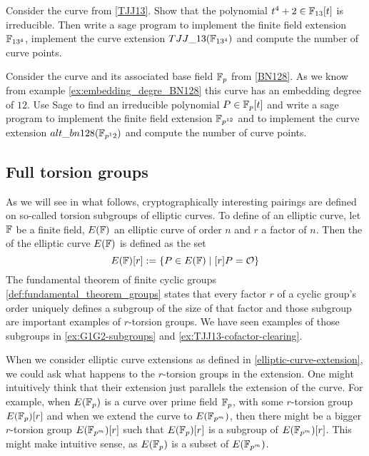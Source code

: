 \begin{exercise}
\label{exercise:TJJ134}
 Consider the  curve from \examplename{} \ref{TJJ13}. Show that the polynomial $t^4+2\in \mathbb{F}_{13}[t]$ is irreducible. Then write a sage program to implement the finite field extension $\mathbb{F}_{13^4}$, implement the curve extension $TJJ\_13(\mathbb{F}_{13^4})$ and compute the number of curve points.
\end{exercise}
\begin{exercise}
\label{exercise:BN128-extension}
Consider the  curve and its associated base field $\mathbb{F}_p$ from \examplename{} \ref{BN128}. As we know from example \ref{ex:embedding_degre_BN128} this curve has an embedding degree of $12$. Use Sage to find an irreducible polynomial $P\in \mathbb{F}_p[t]$ and write a sage program to implement the finite field extension $\mathbb{F}_{p^{12}}$ and to implement the curve extension $alt\_bn128(\mathbb{F}_{p^12})$ and compute the number of curve points.
\end{exercise}
\subsection{Full torsion groups}
\label{sec:full-torsion} As we will see in what follows, cryptographically interesting pairings are defined on so-called torsion subgroups of elliptic curves. To define  of an elliptic curve, let $\mathbb{F}$ be a finite field, $E(\mathbb{F})$ an elliptic curve of order $n$ and $r$ a factor of $n$. Then the  of the elliptic curve $E(\mathbb{F})$ is defined as the set
\begin{equation}
\label{def:torsion_group}
E(\mathbb{F})[r]:= \{P\in E(\mathbb{F})\;|\; [r]P = \mathcal{O}\}
\end{equation} 
The fundamental theorem of finite cyclic groups \ref{def:fundamental_theorem_groups} states that every factor $r$ of a cyclic group's order uniquely defines a subgroup of the size of that factor and those subgroup are important examples of $r$-torsion groups. We have seen examples of those subgroups in \ref{ex:G1G2-subgroups} and \ref{ex:TJJ13-cofactor-clearing}.

When we consider elliptic curve extensions as defined in \ref{elliptic-curve-extension}, we could ask what happens to the $r$-torsion groups in the extension. One might intuitively think that their extension just parallels the extension of the curve. For example, when $E(\mathbb{F}_p)$ is a curve over prime field $\mathbb{F}_p$, with some $r$-torsion group $E(\mathbb{F}_p)[r]$ and when we extend the curve to $E(\mathbb{F}_{p^m})$, then there might be a bigger $r$-torsion group $E(\mathbb{F}_{p^m})[r]$ such that $E(\mathbb{F}_p)[r]$ is a subgroup of $E(\mathbb{F}_{p^m})[r]$. This might make intuitive sense, as $E(\mathbb{F}_p)$ is a subset of $E(\mathbb{F}_{p^m})$. 

